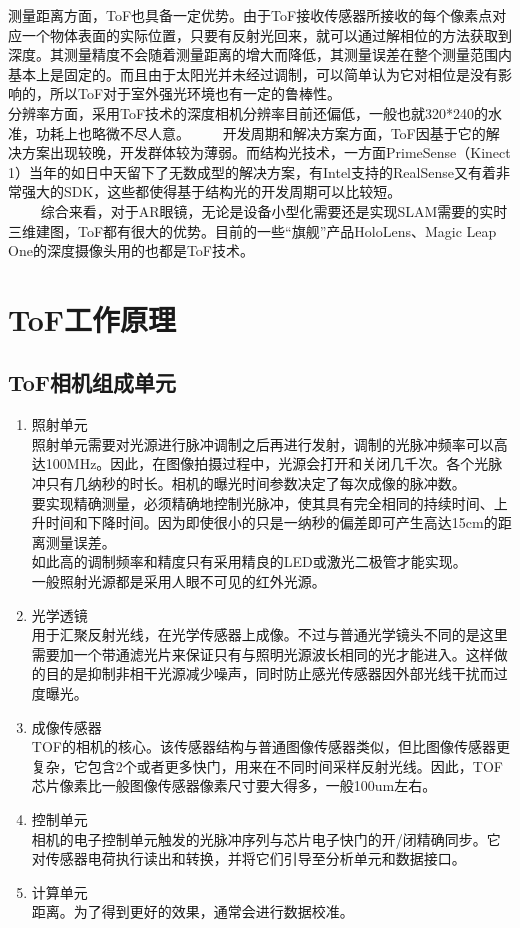 \documentclass[UTF8]{ctexart}
\begin{document}
测量距离方面，ToF也具备一定优势。由于ToF接收传感器所接收的每个像素点对应一个物体表面的实际位置，只要有反射光回来，就可以通过解相位的方法获取到深度。其测量精度不会随着测量距离的增大而降低，其测量误差在整个测量范围内基本上是固定的。而且由于太阳光并未经过调制，可以简单认为它对相位是没有影响的，所以ToF对于室外强光环境也有一定的鲁棒性。\\
分辨率方面，采用ToF技术的深度相机分辨率目前还偏低，一般也就320*240的水准，功耗上也略微不尽人意。 　　开发周期和解决方案方面，ToF因基于它的解决方案出现较晚，开发群体较为薄弱。而结构光技术，一方面PrimeSense（Kinect 1）当年的如日中天留下了无数成型的解决方案，有Intel支持的RealSense又有着非常强大的SDK，这些都使得基于结构光的开发周期可以比较短。\\ 　　
综合来看，对于AR眼镜，无论是设备小型化需要还是实现SLAM需要的实时三维建图，ToF都有很大的优势。目前的一些“旗舰”产品HoloLens、Magic Leap One的深度摄像头用的也都是ToF技术。
\section{ToF工作原理}
\subsection{ToF相机组成单元}
\begin{enumerate}
	\item 照射单元\\
	照射单元需要对光源进行脉冲调制之后再进行发射，调制的光脉冲频率可以高达100MHz。因此，在图像拍摄过程中，光源会打开和关闭几千次。各个光脉冲只有几纳秒的时长。相机的曝光时间参数决定了每次成像的脉冲数。\\ 	
	要实现精确测量，必须精确地控制光脉冲，使其具有完全相同的持续时间、上升时间和下降时间。因为即使很小的只是一纳秒的偏差即可产生高达15cm的距离测量误差。\\
	 如此高的调制频率和精度只有采用精良的LED或激光二极管才能实现。\\
	一般照射光源都是采用人眼不可见的红外光源。
	\item 光学透镜\\
	用于汇聚反射光线，在光学传感器上成像。不过与普通光学镜头不同的是这里需要加一个带通滤光片来保证只有与照明光源波长相同的光才能进入。这样做的目的是抑制非相干光源减少噪声，同时防止感光传感器因外部光线干扰而过度曝光。
	\item 成像传感器 \\
	TOF的相机的核心。该传感器结构与普通图像传感器类似，但比图像传感器更复杂，它包含2个或者更多快门，用来在不同时间采样反射光线。因此，TOF芯片像素比一般图像传感器像素尺寸要大得多，一般100um左右。
	\item 控制单元 \\
	相机的电子控制单元触发的光脉冲序列与芯片电子快门的开/闭精确同步。它对传感器电荷执行读出和转换，并将它们引导至分析单元和数据接口。\\
	\item 计算单元 \\
	距离。为了得到更好的效果，通常会进行数据校准。	
\end{enumerate}
\end{document}
